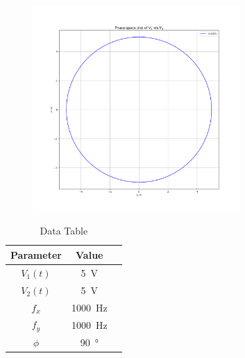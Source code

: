 \documentclass[a4paper,12pt]{article}
\begin{document}
\begin{figure}[htbp]
\begin{center}
    \includegraphics[width=0.7\textwidth]{figs/2/pplot.png}
\end{center}
\end{figure}


\begin{table}[htbp]
    \centering
    \begin{tabular}{|c|c|c|}
        \hline
        \textbf{Parameter} & \textbf{Value} \\
        \hline
        $V_1(t)$ & \SI{5}{\volt} \\
        $V_2(t)$ & \SI{5}{\volt} \\
        $f_x$ & \SI{1000}{\hertz} \\
        $f_y$ & \SI{1000}{\hertz} \\
        $\phi$ & \SI{90}{\degree} \\
        \hline
    \end{tabular}
    \caption{Data Table}
    \label{tab:sample}
\end{table}
\end{document}
